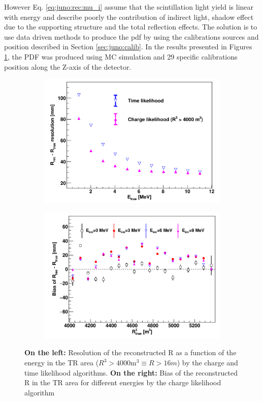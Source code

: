 \documentclass[../main.tex]{subfiles}
\begin{document}
However Eq. \ref{eq:juno:rec:mu_i} assume that the scintillation light yield is linear with energy and describe poorly the contribution of indirect light, shadow effect due to the supporting structure and the total reflection effects. The solution is to use data driven methods to produce the pdf by using the calibrations sources and position described in Section \ref{sec:juno:calib}. In the results presented in Figures \ref{fig:juno:rec:time_charge_results}, the PDF was produced using MC simulation and 29 specific calibrations position \cite{li_event_2021} along the Z-axis of the detector.
\begin{figure}[ht]
  \centering
  \begin{subfigure}[b]{0.48\linewidth}
    \centering
    \includegraphics[width=\textwidth]{images/juno/reco/charge_likelihood_res.png}
  \end{subfigure}
  \hfill
  \begin{subfigure}[b]{0.48\linewidth}
    \centering
    \includegraphics[width=\textwidth]{images/juno/reco/charge_likelihood_bias.png}
  \end{subfigure}
  \caption{\textbf{On the left:} Resolution of the reconstructed R as a function of the energy in the TR area ($R^3 > 4000 \mathrm{m}^3 \equiv R > 16 m$) by the charge and time likelihood algorithms. \textbf{On the right:} Bias of the reconstructed R in the TR area for different energies by the charge likelihood algorithm}
  \label{fig:juno:rec:time_charge_results}
\end{figure}
\end{document}
